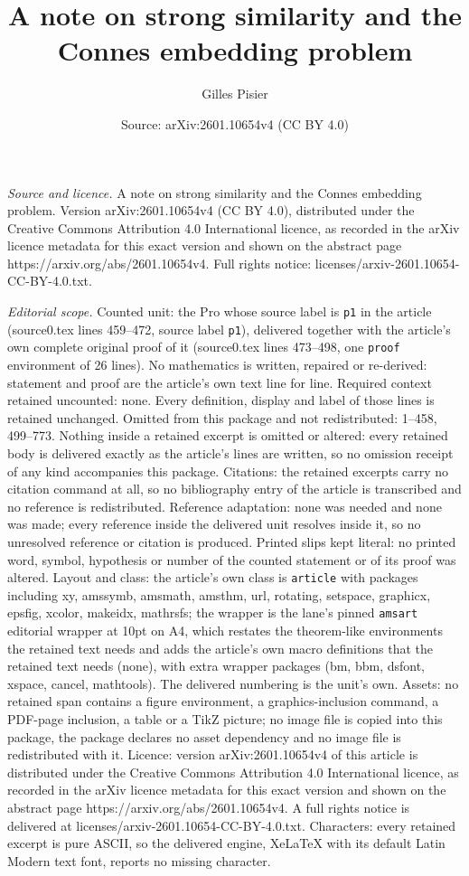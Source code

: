 \documentclass[10pt,a4paper]{amsart}
\title[A note on strong similarity and the Connes embedding problem]{A note on strong similarity and the Connes embedding problem}
\author{Gilles Pisier}
\date{Source: arXiv:2601.10654v4 (CC BY 4.0)}
\begin{document}
\maketitle

\noindent\emph{Source and licence.} A note on strong similarity and the Connes embedding problem. Version arXiv:2601.10654v4 (CC BY 4.0), distributed under the Creative Commons Attribution 4.0 International licence, as recorded in the arXiv licence metadata for this exact version and shown on the abstract page https://arxiv.org/abs/2601.10654v4. Full rights notice: licenses/arxiv-2601.10654-CC-BY-4.0.txt.\par\smallskip

\noindent\textit{Editorial scope.} Counted unit: the Pro whose source label is \texttt{p1} in the article (source0.tex lines 459--472, source label \texttt{p1}), delivered together with the article's own complete original proof of it (source0.tex lines 473--498, one \texttt{proof} environment of 26 lines). No mathematics is written, repaired or re-derived: statement and proof are the article's own text line for line. Required context retained uncounted: none. Every definition, display and label of those lines is retained unchanged. Omitted from this package and not redistributed: 1--458, 499--773. Nothing inside a retained excerpt is omitted or altered: every retained body is delivered exactly as the article's lines are written, so no omission receipt of any kind accompanies this package. Citations: the retained excerpts carry no citation command at all, so no bibliography entry of the article is transcribed and no reference is redistributed. Reference adaptation: none was needed and none was made; every reference inside the delivered unit resolves inside it, so no unresolved reference or citation is produced. Printed slips kept literal: no printed word, symbol, hypothesis or number of the counted statement or of its proof was altered. Layout and class: the article's own class is \texttt{article} with packages including xy, amssymb, amsmath, amsthm, url, rotating, setspace, graphicx, epsfig, xcolor, makeidx, mathrsfs; the wrapper is the lane's pinned \texttt{amsart} editorial wrapper at 10pt on A4, which restates the theorem-like environments the retained text needs and adds the article's own macro definitions that the retained text needs (none), with extra wrapper packages (bm, bbm, dsfont, xspace, cancel, mathtools). The delivered numbering is the unit's own. Assets: no retained span contains a figure environment, a graphics-inclusion command, a PDF-page inclusion, a table or a TikZ picture; no image file is copied into this package, the package declares no asset dependency and no image file is redistributed with it. Licence: version arXiv:2601.10654v4 of this article is distributed under the Creative Commons Attribution 4.0 International licence, as recorded in the arXiv licence metadata for this exact version and shown on the abstract page https://arxiv.org/abs/2601.10654v4. A full rights notice is delivered at licenses/arxiv-2601.10654-CC-BY-4.0.txt. Characters: every retained excerpt is pure ASCII, so the delivered engine, XeLaTeX with its default Latin Modern text font, reports no missing character.
\end{document}
